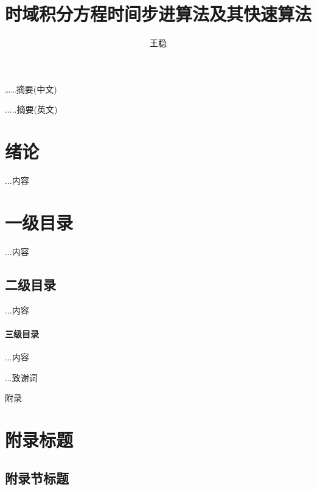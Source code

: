 \documentclass[report]{thesis-uestc}
\title{时域积分方程时间步进算法及其快速算法}{The Time Marching Scheme of Time Domain Integral Equation and Corresponding Fast Algorithm}
\author{王稳}{Wang Wen}                       %
\begin{document}
\makecover

\begin{chineseabstract}
……摘要(中文)

\end{chineseabstract}

\begin{englishabstract}
.....摘要(英文)

\end{englishabstract}

\thesistableofcontents

\chapter{绪\hspace{6pt}论}  %
...内容

\chapter{一级目录}  %
...内容

\section{二级目录}  %
...内容

\subsubsection{三级目录}  %
...内容

\thesisacknowledgement
...致谢词

\thesisappendix
附录

\chapter{附录标题}  %

\section{附录节标题}  %
\end{document}
